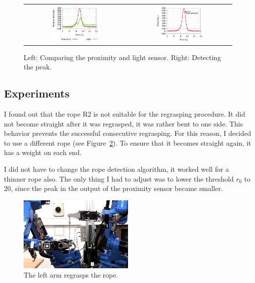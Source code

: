         \begin{figure}[h]
            \centering
            \begin{tabular}{cc}
            \includegraphics[width=0.49\textwidth]{ProximityVsLight.png}
            &
            \includegraphics[width=0.49\textwidth]{ProximityPeak.png}
            \end{tabular}
            \caption{Left: Comparing the proximity and light sensor. Right: Detecting the peak.}
            \label{fig:RopeDetection}
        \end{figure}


    \subsection{Experiments}
        I found out that the rope R2 is not suitable for the regrasping procedure. It did not become straight after it was regrasped, it was rather bent to one side. This behavior prevents the successful consecutive regrasping. For this reason, I decided to use a different rope (see Figure~\ref{fig:Regrasping}). To ensure that it becomes straight again, it has a weight on each end.

        I did not have to change the rope detection algorithm, it worked well for a thinner rope also. The only thing I had to adjust was to lower the threshold $r_0$ to 20, since the peak in the output of the proximity sensor became smaller.

        \begin{figure}
        \includegraphics[width=0.5\textwidth]{Regrasping.png}
        \centering
        \caption{The left arm regrasps the rope.}
        \label{fig:Regrasping}
        \end{figure}

